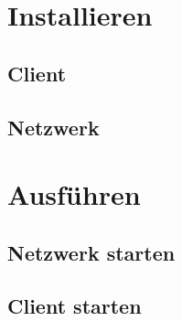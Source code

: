 \documentclass[parskip=full]{scrartcl}
\begin{document}
	
	\section{Installieren}
	\subsection{Client}
	
	
	\subsection{Netzwerk}
	
	\section{Ausführen}
	\subsection{Netzwerk starten}
	
	\subsection{Client starten}
		
\end{document}
